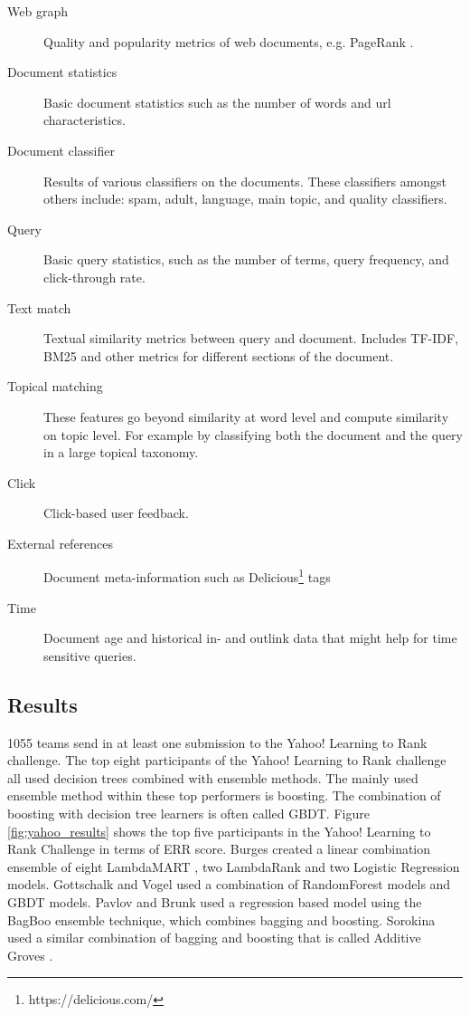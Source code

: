 \begin{description}
\item[Web graph]{Quality and popularity metrics of web documents, e.g. PageRank \cite{Page1999}}.
\item[Document statistics]{Basic document statistics such as the number of words and url characteristics.}
\item[Document classifier]{Results of various classifiers on the documents. These classifiers amongst others include: spam, adult, language, main topic, and quality classifiers.}
\item[Query]{Basic query statistics, such as the number of terms, query frequency, and click-through rate.}
\item[Text match]{Textual similarity metrics between query and document. Includes \ac{TF-IDF}, BM25 \cite{Robertson2009} and other metrics for different sections of the document.}
\item[Topical matching]{These features go beyond similarity at word level and compute similarity on topic level. For example by classifying both the document and the query in a large topical taxonomy.}
\item[Click]{Click-based user feedback.}
\item[External references]{Document meta-information such as Delicious\footnote{https://delicious.com/} tags}
\item[Time]{Document age and historical in- and outlink data that might help for time sensitive queries.}
\end{description}

\subsection{Results}
1055 teams send in at least one submission to the Yahoo! Learning to Rank challenge. The top eight participants of the Yahoo! Learning to Rank challenge all used decision trees combined with ensemble methods. The mainly used ensemble method within these top performers is boosting. The combination of boosting with decision tree learners is often called \acf{GBDT}. Figure \ref{fig:yahoo_results} shows the top five participants in the Yahoo! Learning to Rank Challenge in terms of ERR score.  Burges  \cite{Burges2011} created a linear combination ensemble of eight LambdaMART \cite{Burges2010}, two LambdaRank and two Logistic Regression models. Gottschalk and Vogel used a combination of RandomForest models and \ac{GBDT} models. Pavlov and Brunk used a regression based model using the BagBoo \cite{Pavlov2010} ensemble technique, which combines bagging and boosting. Sorokina used a similar combination of bagging and boosting that is called Additive Groves \cite{Sorokina2007}.\\

